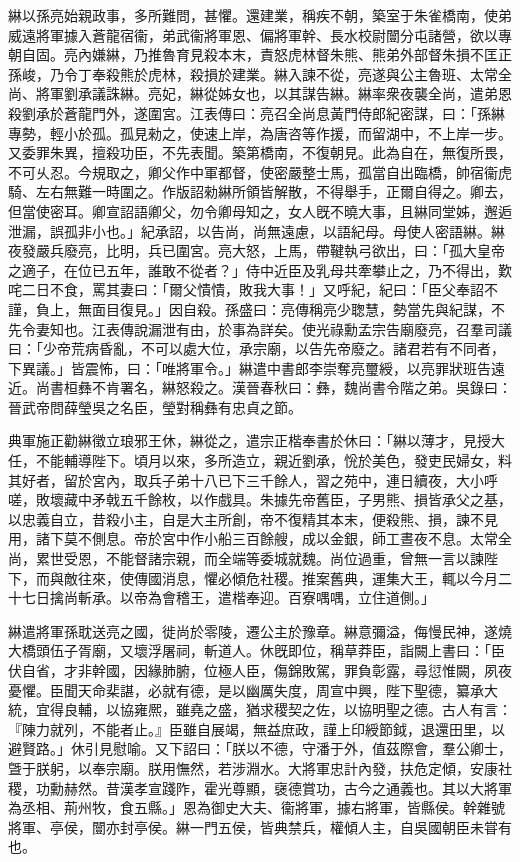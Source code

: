 \begin{pinyinscope}
綝以孫亮始親政事，多所難問，甚懼。還建業，稱疾不朝，築室于朱雀橋南，使弟威遠將軍據入蒼龍宿衞，弟武衞將軍恩、偏將軍幹、長水校尉闓分屯諸營，欲以專朝自固。亮內嫌綝，乃推魯育見殺本末，責怒虎林督朱熊、熊弟外部督朱損不匡正孫峻，乃令丁奉殺熊於虎林，殺損於建業。綝入諫不從，亮遂與公主魯班、太常全尚、將軍劉承議誅綝。亮妃，綝從姊女也，以其謀告綝。綝率衆夜襲全尚，遣弟恩殺劉承於蒼龍門外，遂圍宮。江表傳曰：亮召全尚息黃門侍郎紀密謀，曰：「孫綝專勢，輕小於孤。孤見勑之，使速上岸，為唐咨等作援，而留湖中，不上岸一步。又委罪朱異，擅殺功臣，不先表聞。築第橋南，不復朝見。此為自在，無復所畏，不可乆忍。今規取之，卿父作中軍都督，使密嚴整士馬，孤當自出臨橋，帥宿衞虎騎、左右無難一時圍之。作版詔勑綝所領皆解散，不得舉手，正爾自得之。卿去，但當使密耳。卿宣詔語卿父，勿令卿母知之，女人旣不曉大事，且綝同堂姊，邂逅泄漏，誤孤非小也。」紀承詔，以告尚，尚無遠慮，以語紀母。母使人密語綝。綝夜發嚴兵廢亮，比明，兵已圍宮。亮大怒，上馬，帶鞬執弓欲出，曰：「孤大皇帝之適子，在位已五年，誰敢不從者？」侍中近臣及乳母共牽攀止之，乃不得出，歎咤二日不食，罵其妻曰：「爾父憒憒，敗我大事！」又呼紀，紀曰：「臣父奉詔不謹，負上，無面目復見。」因自殺。孫盛曰：亮傳稱亮少聦慧，勢當先與紀謀，不先令妻知也。江表傳說漏泄有由，於事為詳矣。使光祿勳孟宗告廟廢亮，召羣司議曰：「少帝荒病昏亂，不可以處大位，承宗廟，以告先帝廢之。諸君若有不同者，下異議。」皆震怖，曰：「唯將軍令。」綝遣中書郎李崇奪亮璽綬，以亮罪狀班告遠近。尚書桓彝不肯署名，綝怒殺之。漢晉春秋曰：彝，魏尚書令階之弟。吳錄曰：晉武帝問薛瑩吳之名臣，瑩對稱彝有忠貞之節。

典軍施正勸綝徵立琅邪王休，綝從之，遣宗正楷奉書於休曰：「綝以薄才，見授大任，不能輔導陛下。頃月以來，多所造立，親近劉承，恱於美色，發吏民婦女，料其好者，留於宮內，取兵子弟十八已下三千餘人，習之苑中，連日續夜，大小呼嗟，敗壞藏中矛戟五千餘枚，以作戲具。朱據先帝舊臣，子男熊、損皆承父之基，以忠義自立，昔殺小主，自是大主所創，帝不復精其本末，便殺熊、損，諫不見用，諸下莫不側息。帝於宮中作小船三百餘艘，成以金銀，師工晝夜不息。太常全尚，累世受恩，不能督諸宗親，而全端等委城就魏。尚位過重，曾無一言以諫陛下，而與敵往來，使傳國消息，懼必傾危社稷。推案舊典，運集大王，輒以今月二十七日擒尚斬承。以帝為會稽王，遣楷奉迎。百寮喁喁，立住道側。」

綝遣將軍孫耽送亮之國，徙尚於零陵，遷公主於豫章。綝意彌溢，侮慢民神，遂燒大橋頭伍子胥廟，又壞浮屠祠，斬道人。休旣即位，稱草莽臣，詣闕上書曰：「臣伏自省，才非幹國，因緣肺腑，位極人臣，傷錦敗駕，罪負彰露，尋愆惟闕，夙夜憂懼。臣聞天命棐諶，必就有德，是以幽厲失度，周宣中興，陛下聖德，纂承大統，宜得良輔，以協雍熈，雖堯之盛，猶求稷契之佐，以協明聖之德。古人有言：『陳力就列，不能者止。』臣雖自展竭，無益庶政，謹上印綬節鉞，退還田里，以避賢路。」休引見慰喻。又下詔曰：「朕以不德，守潘于外，值茲際會，羣公卿士，曁于朕躬，以奉宗廟。朕用憮然，若涉淵水。大將軍忠計內發，扶危定傾，安康社稷，功勳赫然。昔漢孝宣踐阼，霍光尊顯，襃德賞功，古今之通義也。其以大將軍為丞相、荊州牧，食五縣。」恩為御史大夫、衞將軍，據右將軍，皆縣侯。幹雜號將軍、亭侯，闓亦封亭侯。綝一門五侯，皆典禁兵，權傾人主，自吳國朝臣未甞有也。


\end{pinyinscope}
